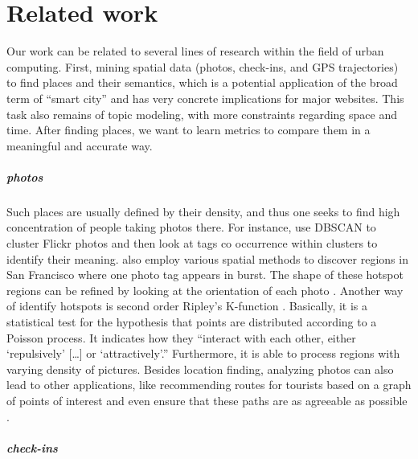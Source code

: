\chapter{Related work}
\label{chap:related}

Our work can be related to several lines of research within the field of urban
computing. First, mining spatial data (photos, check-ins, and GPS
trajectories) to find places and their semantics, which is a potential
application of the broad term of \enquote{smart city} and has very concrete
implications for major websites. This task also remains of topic modeling,
with more constraints regarding space and time. After finding places, we want
to learn metrics to compare them in a meaningful and accurate way.

\paragraph{photos}

Such places are usually defined by their density, and thus one seeks to find
high concentration of people taking photos there. For instance,
\textcite{Deng2009} use \textsc{DBSCAN} to cluster Flickr photos and then look
at tags co occurrence within clusters to identify their meaning.
\Textcite{Rattenbury2009} also employ various spatial methods to discover
regions in San Francisco where one photo tag appears in burst. The shape of
these hotspot regions can be refined by looking at the orientation of each
photo \autocite{Hotspots12}. Another way of identify hotspots is second order
Ripley's K-function \autocite{TagHotspot12}. Basically, it is a statistical
test for the hypothesis that points are distributed according to a Poisson
process. It indicates how they \enquote{interact with each other, either
\enquote{repulsively} [\dots] or \enquote{attractively}.} Furthermore, it is
able to process regions with varying density of pictures. Besides location
finding, analyzing photos can also lead to other applications, like
recommending routes for tourists based on a graph of points of interest
\autocite{CityItineraries10} and even ensure that these paths are as agreeable
as possible \autocite{Quercia2014}.

\paragraph{check-ins}

